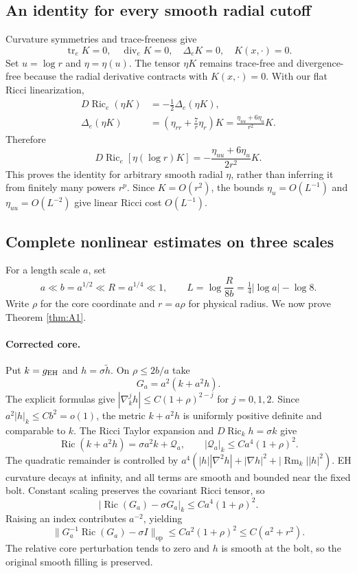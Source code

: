 \documentclass[a4paper,11pt]{article}
\numberwithin{equation}{section}
\theoremstyle{definition}
\newcommand{\Ric}{\operatorname{Ric}}
\newcommand{\Rm}{\operatorname{Rm}}
\newcommand{\tr}{\operatorname{tr}}
\newcommand{\op}{\mathrm{op}}
\begin{document}
\subsection{An identity for every smooth radial cutoff}
Curvature symmetries and trace-freeness give
\[
\tr_eK=0,\quad \operatorname{div}_eK=0,\quad
\Delta_eK=0,\quad K(x,\cdot)=0.
\]
Set $u=\log r$ and $\eta=\eta(u)$. The tensor $\eta K$ remains trace-free and divergence-free because the radial derivative contracts with $K(x,\cdot)=0$. With our flat Ricci linearization,
\begin{align}
D\Ric_e(\eta K)&=-\tfrac12\Delta_e(\eta K),\\
\Delta_e(\eta K)&=\left(\eta_{rr}+\frac7r\eta_r\right)K
=\frac{\eta_{uu}+6\eta_u}{r^2}K.
\end{align}
Therefore
\begin{equation}\label{eq:logidentity}
\boxed{D\Ric_e[\eta(\log r)K]=-
\frac{\eta_{uu}+6\eta_u}{2r^2}K.}
\end{equation}
This proves the identity for arbitrary smooth radial $\eta$, rather than inferring it from finitely many powers $r^p$. Since $K=O(r^2)$, the bounds $\eta_u=O(L^{-1})$ and $\eta_{uu}=O(L^{-2})$ give linear Ricci cost $O(L^{-1})$.

\subsection{Complete nonlinear estimates on three scales}
For a length scale $a$, set
\begin{equation}
a\ll b=a^{1/2}\ll R=a^{1/4}\ll1,\qquad
L=\log\frac{R}{8b}=\tfrac14|\log a|-\log8.
\end{equation}
Write $\rho$ for the core coordinate and $r=a\rho$ for physical radius. We now prove Theorem \ref{thm:A1}.

\paragraph{Corrected core.}
Put $k=g_{\rm EH}$ and $h=\sigma\widetilde h$. On $\rho\le2b/a$ take
\[
G_a=a^2(k+a^2h).
\]
The explicit formulas give $|\nabla_k^jh|\le C(1+\rho)^{2-j}$ for $j=0,1,2$. Since
$a^2|h|_k\le Cb^2=o(1)$, the metric $k+a^2h$ is uniformly positive definite and comparable to $k$. The Ricci Taylor expansion and $D\Ric_kh=\sigma k$ give
\[
\Ric(k+a^2h)=\sigma a^2k+\mathcal Q_a,\qquad
|\mathcal Q_a|_k\le Ca^4(1+\rho)^2.
\]
The quadratic remainder is controlled by
$a^4(|h||\nabla^2h|+|\nabla h|^2+|\Rm_k||h|^2)$.
EH curvature decays at infinity, and all terms are smooth and bounded near the fixed bolt.
Constant scaling preserves the covariant Ricci tensor, so
\[
|\Ric(G_a)-\sigma G_a|_k\le Ca^4(1+\rho)^2.
\]
Raising an index contributes $a^{-2}$, yielding
\begin{equation}\label{eq:coreestimate}
\|G_a^{-1}\Ric(G_a)-\sigma I\|_{\op}
\le C a^2(1+\rho)^2\le C(a^2+r^2).
\end{equation}
The relative core perturbation tends to zero and $h$ is smooth at the bolt, so the original smooth filling is preserved.
\end{document}
